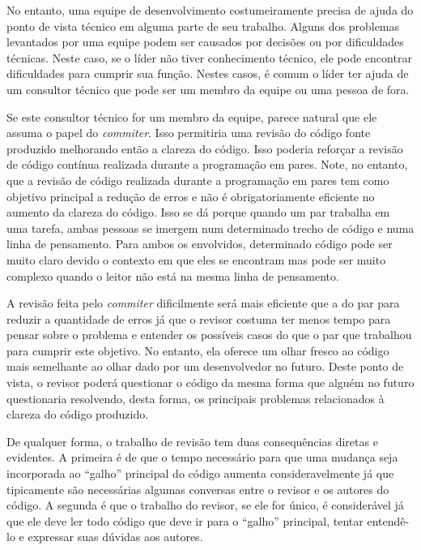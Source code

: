 No entanto, uma equipe de desenvolvimento costumeiramente precisa de
ajuda do ponto de vista técnico em alguma parte de seu
trabalho. Alguns dos problemas levantados por uma equipe podem ser
causados por decisões ou por dificuldades técnicas. Neste caso, se o
líder não tiver conhecimento técnico, ele pode encontrar dificuldades
para cumprir sua função. Nestes casos, é comum o líder ter ajuda de um
consultor técnico que pode ser um membro da equipe ou uma pessoa de
fora.

Se este consultor técnico for um membro da equipe, parece natural que
ele assuma o papel do \emph{commiter}. Isso permitiria uma revisão do
código fonte produzido melhorando então a clareza do código. Isso
poderia reforçar a revisão de código contínua realizada durante a
programação em pares. Note, no entanto, que a revisão de código
realizada durante a programação em pares tem como objetivo principal a
redução de erros e não é obrigatoriamente eficiente no aumento da
clareza do código. Isso se dá porque quando um par trabalha em uma
tarefa, ambas pessoas se imergem num determinado trecho de código e
numa linha de pensamento. Para ambos os envolvidos, determinado código
pode ser muito claro devido o contexto em que eles se encontram mas
pode ser muito complexo quando o leitor não está na mesma linha de
pensamento.

A revisão feita pelo \emph{commiter} dificilmente será mais eficiente
que a do par para reduzir a quantidade de erros já que o revisor
costuma ter menos tempo para pensar sobre o problema e entender os
possíveis casos do que o par que trabalhou para cumprir este
objetivo. No entanto, ela oferece um olhar fresco ao código mais
semelhante ao olhar dado por um desenvolvedor no futuro. Deste ponto
de vista, o revisor poderá questionar o código da mesma forma que
alguém no futuro questionaria resolvendo, desta forma, os principais
problemas relacionados à clareza do código produzido.

De qualquer forma, o trabalho de revisão tem duas consequências
diretas e evidentes. A primeira é de que o tempo necessário para que
uma mudança seja incorporada ao ``galho'' principal do código aumenta
consideravelmente já que tipicamente são necessárias algumas conversas
entre o revisor e os autores do código. A segunda é que o trabalho do
revisor, se ele for único, é considerável já que ele deve ler todo
código que deve ir para o ``galho'' principal, tentar entendê-lo e
expressar suas dúvidas aos autores.

